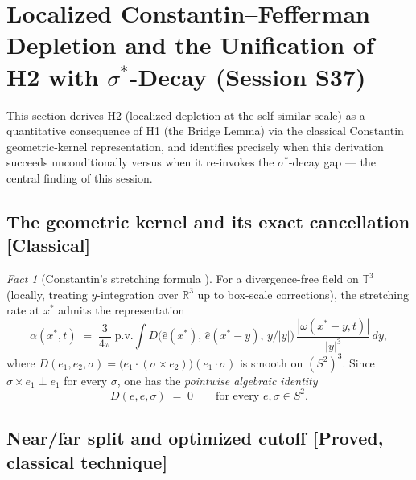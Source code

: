 \documentclass[11pt]{article}
\theoremstyle{definition}
\theoremstyle{remark}
\newtheorem{fact}[theorem]{Fact}
\newcommand{\R}{\mathbb{R}}
\newcommand{\T}{\mathbb{T}}
\begin{document}
\section{Localized Constantin--Fefferman Depletion and the Unification of H2 with $\sigma^*$-Decay (Session S37)}
\label{sec:cf-s37}

This section derives H2 (localized depletion at the self-similar scale) as a
quantitative consequence of H1 (the Bridge Lemma) via the classical
Constantin geometric-kernel representation, and identifies precisely when
this derivation succeeds unconditionally versus when it re-invokes the
$\sigma^*$-decay gap --- the central finding of this session.

\subsection{The geometric kernel and its exact cancellation [Classical]}

\begin{fact}[Constantin's stretching formula \cite{Constantin1994}]\label{fact:constantin-formula}
  For a divergence-free field on $\T^3$ (locally, treating $y$-integration
  over $\R^3$ up to box-scale corrections), the stretching rate at $x^*$
  admits the representation
  \[
    \alpha(x^*,t) \;=\; \frac{3}{4\pi}\;\mathrm{p.v.}\!\int
      D\bigl(\hat{e}(x^*),\,\hat{e}(x^*-y),\,y/|y|\bigr)\,
      \frac{|\omega(x^*-y,t)|}{|y|^3}\,dy,
  \]
  where $D(e_1,e_2,\sigma) = \bigl(e_1\cdot(\sigma\times e_2)\bigr)(e_1\cdot\sigma)$
  is smooth on $(S^2)^3$. Since $\sigma\times e_1 \perp e_1$ for every
  $\sigma$, one has the \emph{pointwise algebraic identity}
  \[
    D(e,e,\sigma) \;=\; 0 \qquad\text{for every }e,\sigma\in S^2.
  \]
\end{fact}

\subsection{Near/far split and optimized cutoff [Proved, classical technique]}
\end{document}

